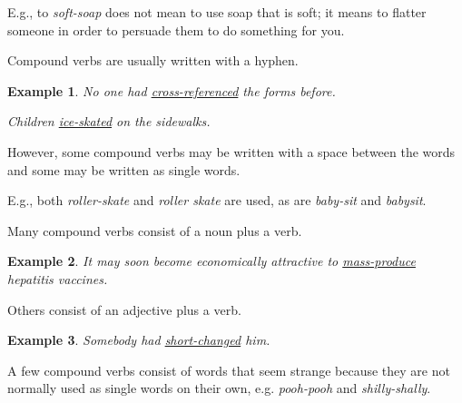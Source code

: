 \documentclass[oneside]{book}
\numberwithin{equation}{section}
\newtheorem{example}{Example}[section]
\begin{document}
E.g., to \textit{soft-soap} does not mean to use soap that is soft; it means to flatter someone in order to persuade them to do something for you.

%
\noindent{} Compound verbs are usually written with a hyphen.
\begin{example}
    No one had \underline{cross-referenced} the forms before.
    
    Children \underline{ice-skated} on the sidewalks.
\end{example}
However, some compound verbs may be written with a space between the words and some may be written as single words.

E.g., both \textit{roller-skate} and \textit{roller skate} are used, as are \textit{baby-sit} and \textit{babysit}.

%
\noindent{} Many compound verbs consist of a noun plus a verb.
\begin{example}
    It may soon become economically attractive to \underline{mass-produce} hepatitis vaccines.
\end{example}
Others consist of an adjective plus a verb.
\begin{example}
    Somebody had \underline{short-changed} him.
\end{example}
%
\noindent{} A few compound verbs consist of words that seem strange because they are not normally used as single words on their own, e.g. \textit{pooh-pooh} and \textit{shilly-shally}.
\end{document}
